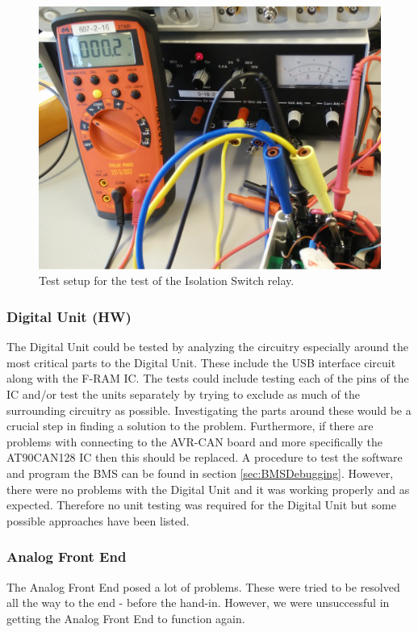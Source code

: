 \begin{figure}[H]
	\centering
	\includegraphics[width=1.0\linewidth]{Hardware/Pictures/BMSIsoTest}
	\caption[Empty]{Test setup for the test of the Isolation Switch relay.}
	\label{fig:BMSIsoTest}
\end{figure}

\subsubsection{Digital Unit (HW)}
The Digital Unit could be tested by analyzing the circuitry especially around the most critical parts to the Digital Unit. These include the USB interface circuit along with the F-RAM IC. The tests could include testing each of the pins of the IC and/or test the units separately by trying to exclude as much of the surrounding circuitry as possible. Investigating the parts around these would be a crucial step in finding a solution to the problem. Furthermore, if there are problems with connecting to the AVR-CAN board and more specifically the AT90CAN128 IC then this should be replaced. A procedure to test the software and program the BMS can be found in section \vref{sec:BMSDebugging}. However, there were no problems with the Digital Unit and it was working properly and as expected. Therefore no unit testing was required for the Digital Unit but some possible approaches have been listed. 

\subsubsection{Analog Front End}
The Analog Front End posed a lot of problems. These were tried to be resolved all the way to the end - before the hand-in. However, we were unsuccessful in getting the Analog Front End to function again.\\

